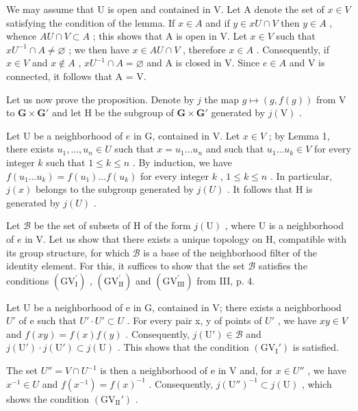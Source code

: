 We may assume that U is open and contained in V. Let A denote the set of \(x \in V\) satisfying the condition of the lemma. If \(x \in A\) and if \(y \in xU \cap V\) then \(y \in A\) , whence \(AU \cap V \subset A\) ; this shows that A is open in V. Let \(x \in V\) such that \(xU^{-1} \cap A \neq \varnothing\) ; we then have \(x \in AU \cap V\) , therefore \(x \in A\) . Consequently, if \(x \in V\) and \(x \notin A\) , \(xU^{-1} \cap A = \varnothing\) and A is closed in V. Since \(e \in A\) and V is connected, it follows that A = V.

Let us now prove the proposition. Denote by \(j\) the map \(g \mapsto (g, f(g))\) from V to \(\mathbf{G} \times \mathbf{G}'\) and let H be the subgroup of \(\mathbf{G} \times \mathbf{G}'\) generated by \(j(\mathrm{V})\) .

Let U be a neighborhood of \(e\) in G, contained in V. Let \(x \in V\) ; by Lemma 1, there exists \(u_1, \ldots, u_n \in U\) such that \(x = u_1 \ldots u_n\) and such that \(u_1 \ldots u_k \in V\) for every integer \(k\) such that \(1 \leqslant k \leqslant n\) . By induction, we have \(f(u_1 \ldots u_k) = f(u_1) \ldots f(u_k)\) for every integer \(k\) , \(1 \leqslant k \leqslant n\) . In particular, \(j(x)\) belongs to the subgroup generated by \(j(U)\) . It follows that H is generated by \(j(U)\) .

Let \(\mathcal{B}\) be the set of subsets of H of the form \(j(\mathrm{U})\) , where U is a neighborhood of \(e\) in V. Let us show that there exists a unique topology on H, compatible with its group structure, for which \(\mathcal{B}\) is a base of the neighborhood filter of the identity element. For this, it suffices to show that the set \(\mathcal{B}\) satisfies the conditions \((\mathrm{GV}_{\mathrm{I}}^{\prime})\) , \((\mathrm{GV}_{\mathrm{II}}^{\prime})\) and \((\mathrm{GV}_{\mathrm{III}}^{\prime})\) from III, p. 4.

Let U be a neighborhood of e in G, contained in V; there exists a neighborhood \(U'\) of e such that \(U' \cdot U' \subset U\) . For every pair x, y of points of \(U'\) , we have \(xy \in V\) and \(f(xy) = f(x)f(y)\) . Consequently, \(j(\mathrm{U}') \in \mathcal{B}\) and \(j(\mathrm{U}') \cdot j(\mathrm{U}') \subset j(\mathrm{U})\) . This shows that the condition \((\mathrm{GV}_{\mathrm{I}}')\) is satisfied.

The set \(U'' = V \cap U^{-1}\) is then a neighborhood of e in V and, for \(x \in U''\) , we have \(x^{-1} \in U\) and \(f(x^{-1}) = f(x)^{-1}\) . Consequently, \(j(\mathrm{U}'')^{-1} \subset j(\mathrm{U})\) , which shows the condition \((\mathrm{GV}_{\mathrm{II}}' )\) .

